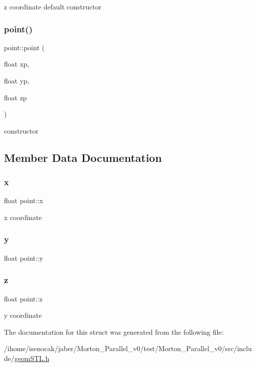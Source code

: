 z coordinate default constructor \mbox{\label{structpoint_aecb0ac3f8ece9589eac6ff62388075b5}} 
\subsubsection{\texorpdfstring{point()}{point()}\hspace{0.1cm}{\footnotesize\ttfamily [2/2]}}
{\footnotesize\ttfamily point\+::point (\begin{DoxyParamCaption}\item[{float}]{xp,  }\item[{float}]{yp,  }\item[{float}]{zp }\end{DoxyParamCaption})\hspace{0.3cm}{\ttfamily [inline]}}

constructor 

\subsection{Member Data Documentation}
\mbox{\label{structpoint_a8293fd2de3ce739deb6d53691fd21fcf}} 
\subsubsection{\texorpdfstring{x}{x}}
{\footnotesize\ttfamily float point\+::x}

x coordinate \mbox{\label{structpoint_a616ad85a2096d1566f5971666bbc3b3f}} 
\subsubsection{\texorpdfstring{y}{y}}
{\footnotesize\ttfamily float point\+::y}

\mbox{\label{structpoint_a3c15cf62431e51a4d9432ca40b3b04f5}} 
\subsubsection{\texorpdfstring{z}{z}}
{\footnotesize\ttfamily float point\+::z}

y coordinate 

The documentation for this struct was generated from the following file\+:\begin{DoxyCompactItemize}
\item 
/ihome/isenocak/jaber/\+Morton\+\_\+\+Parallel\+\_\+v0/test/\+Morton\+\_\+\+Parallel\+\_\+v0/src/include/\mbox{\hyperlink{geomSTL_8h}{geom\+S\+T\+L.\+h}}\end{DoxyCompactItemize}

